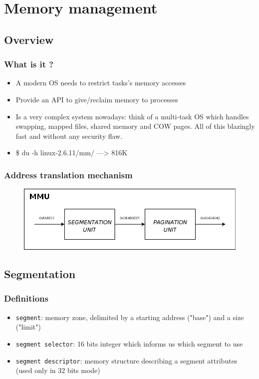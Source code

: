 \documentclass{beamer}
\begin{document}
\section{Memory management}

\subsection{Overview}

\begin{frame}
  \frametitle{What is it ?}

  \begin{itemize}
  \item
    A modern OS needs to restrict tasks's memory accesses
  \item
    Provide an API to give/reclaim memory to processes
  \item
    Is a very complex system nowadays: think of a multi-task OS which handles swapping, mapped files, shared memory and COW pages. All of this blazingly fast and without any security flaw.
  \item
    \$ du -h linux-2.6.11/mm/ ---> 816K
  \end{itemize}
\end{frame}

\begin{frame}
  \frametitle{Address translation mechanism}

  \begin{figure}
  \includegraphics[scale=0.25]{mmu.png}
  \end{figure}
\end{frame}

\subsection{Segmentation}

\begin{frame}
  \frametitle{Definitions}

  \begin{itemize}
  \item
    \texttt{segment}: memory zone, delimited by a starting address ("base") and a size ("limit")
  \item
    \texttt{segment selector}: 16 bits integer which informs us which segment to use
  \item
    \texttt{segment descriptor}: memory structure describing a segment attributes (used only in 32 bits mode)
  \end{itemize}
\end{frame}
\end{document}
